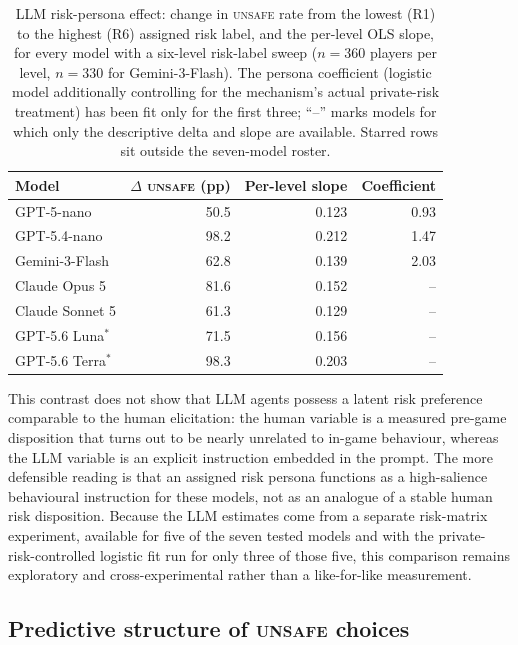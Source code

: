 \documentclass[sigconf]{aamas}
\newcommand{\Unsafe}{\textsc{unsafe}}
\begin{document}
\begin{table}[t]
    \caption{LLM risk-persona effect: change in \Unsafe{} rate from the
    lowest (R1) to the highest (R6) assigned risk label, and the per-level
    OLS slope, for every model with a six-level risk-label sweep ($n=360$
    players per level, $n=330$ for Gemini-3-Flash). The persona coefficient
    (logistic model additionally controlling for the mechanism's actual
    private-risk treatment) has been fit only for the first three; ``--''
    marks models for which only the descriptive delta and slope are
    available. Starred rows sit outside the seven-model roster.}
    \label{tab:persona-effect}
    \centering
    \small
    \begin{tabular}{@{}lrrr@{}}
        \toprule
        Model & $\Delta$ \Unsafe{} (pp) & Per-level slope & Coefficient \\
        \midrule
        GPT-5-nano       & 50.5 & 0.123 & 0.93 \\
        GPT-5.4-nano     & 98.2 & 0.212 & 1.47 \\
        Gemini-3-Flash   & 62.8 & 0.139 & 2.03 \\
        Claude Opus 5    & 81.6 & 0.152 & -- \\
        Claude Sonnet 5  & 61.3 & 0.129 & -- \\
        GPT-5.6 Luna$^*$  & 71.5 & 0.156 & -- \\
        GPT-5.6 Terra$^*$ & 98.3 & 0.203 & -- \\
        \bottomrule
    \end{tabular}
\end{table}

This contrast does not show that LLM agents possess a latent risk
preference comparable to the human elicitation: the human variable is a
measured pre-game disposition that turns out to be nearly unrelated to
in-game behaviour, whereas the LLM variable is an explicit instruction
embedded in the prompt. The more defensible reading is that an assigned
risk persona functions as a high-salience behavioural instruction for
these models, not as an analogue of a stable human risk
disposition. Because the LLM estimates come from a separate risk-matrix
experiment, available for five of the seven tested models and with the
private-risk-controlled logistic fit run for only three of those five,
this comparison remains exploratory and cross-experimental rather than a
like-for-like measurement.

\subsection{Predictive structure of \Unsafe{} choices}
\label{app:predictive-structure}
\end{document}
